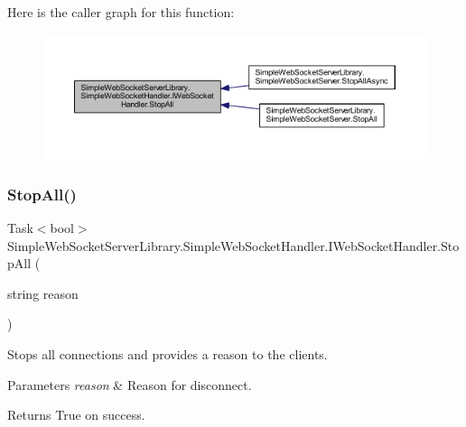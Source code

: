 Here is the caller graph for this function\+:
\nopagebreak
\begin{figure}[H]
\begin{center}
\leavevmode
\includegraphics[width=350pt]{interface_simple_web_socket_server_library_1_1_simple_web_socket_handler_1_1_i_web_socket_handler_a9320e5c10e5afa670c1377b5c0e2f762_icgraph}
\end{center}
\end{figure}
\mbox{\label{interface_simple_web_socket_server_library_1_1_simple_web_socket_handler_1_1_i_web_socket_handler_a27d174acc63098601266f85f4e3f873f}} 
\subsubsection{\texorpdfstring{Stop\+All()}{StopAll()}\hspace{0.1cm}{\footnotesize\ttfamily [2/2]}}
{\footnotesize\ttfamily Task$<$bool$>$ Simple\+Web\+Socket\+Server\+Library.\+Simple\+Web\+Socket\+Handler.\+I\+Web\+Socket\+Handler.\+Stop\+All (\begin{DoxyParamCaption}\item[{string}]{reason }\end{DoxyParamCaption})}



Stops all connections and provides a reason to the clients. 


\begin{DoxyParams}{Parameters}
{\em reason} & Reason for disconnect.\\
\hline
\end{DoxyParams}
\begin{DoxyReturn}{Returns}
True on success.
\end{DoxyReturn}


